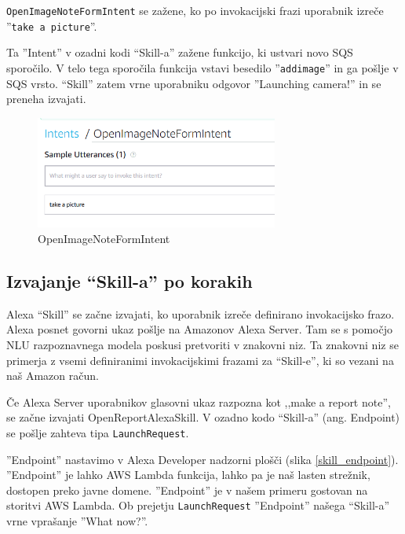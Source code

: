\documentclass[a4paper, 12pt]{book}
\begin{document}
\texttt{OpenImageNoteFormIntent} se zažene, ko po invokacijski frazi uporabnik izreče ''\texttt{take a picture}''.

Ta ''Intent'' v ozadni kodi \enquote{Skill-a} zažene funkcijo, ki ustvari novo SQS sporočilo.
V telo tega sporočila funkcija vstavi besedilo ''\texttt{addimage}'' in ga pošlje v SQS vrsto.
\enquote{Skill} zatem vrne uporabniku odgovor ''Launching camera!'' in se preneha izvajati.

\begin{figure}[H]
\begin{center}
\includegraphics[width=8cm]{intent_image}
\end{center}
\caption{OpenImageNoteFormIntent}
\label{OpenImageNoteFormIntent}
\end{figure}

\subsection{Izvajanje \enquote{Skill-a} po korakih}

Alexa \enquote{Skill} se začne izvajati, ko uporabnik izreče definirano invokacijsko frazo.
Alexa posnet govorni ukaz pošlje na Amazonov Alexa Server.
Tam se s pomočjo NLU razpoznavnega modela poskusi pretvoriti v znakovni niz.
Ta znakovni niz se primerja z vsemi definiranimi invokacijskimi frazami za \enquote{Skill-e}, ki so vezani na naš Amazon račun.

Če Alexa Server uporabnikov glasovni ukaz razpozna kot ,,make a report note'', se začne izvajati OpenReportAlexaSkill.
V ozadno kodo \enquote{Skill-a} (ang. Endpoint) se pošlje zahteva tipa \texttt{LaunchRequest}.

''Endpoint'' nastavimo v Alexa Developer nadzorni plošči (slika \ref{skill_endpoint}).
''Endpoint'' je lahko AWS Lambda funkcija, lahko pa je naš lasten strežnik, dostopen preko javne domene.
''Endpoint'' je v našem primeru gostovan na storitvi AWS Lambda.
Ob prejetju \texttt{LaunchRequest} ''Endpoint'' našega \enquote{Skill-a} vrne vprašanje ''What now?''.
\end{document}
